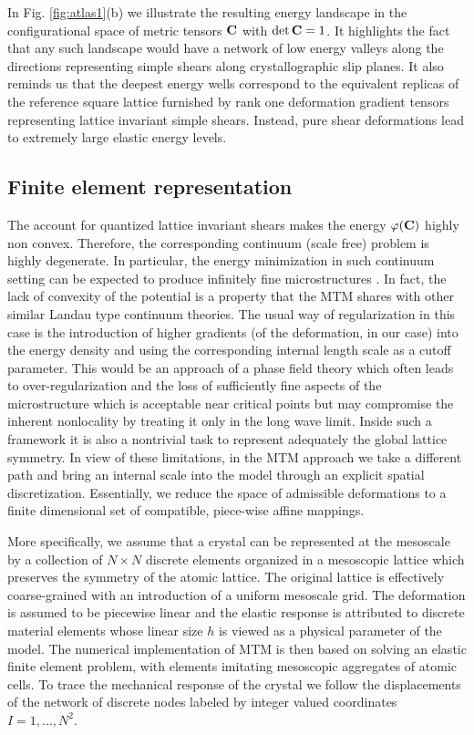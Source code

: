 \documentclass[aps,
superscriptaddress,notitlepage]{revtex4-1}
\def\phi{\varphi}
\begin{document}
In Fig. \ref{fig:atlas1}(b) we illustrate the resulting energy landscape  in the configurational space of metric tensors $\bf C$ with $\det{\bf C}=1$. It highlights the fact that any such  landscape would have  a network of low energy valleys along the directions representing simple shears along   crystallographic slip planes. It also reminds us that   the deepest energy wells  correspond  to the equivalent replicas of the reference square  lattice  furnished  by rank one deformation gradient tensors  representing lattice invariant simple shears. Instead, pure shear deformations  lead to extremely large elastic energy levels.

 

\subsection{Finite element representation}
\label{subsec:MTM_numerical_method}

The account for quantized lattice invariant shears makes the energy $\phi(\bf C)$ highly  non convex. Therefore,  the corresponding  continuum (scale free) problem is  highly degenerate.  In particular,  the energy minimization in such  continuum setting can be expected to produce infinitely fine microstructures \cite{Fonseca1987-pd}. In fact,  the lack of convexity of the potential is a property that the MTM   shares with other similar Landau type continuum theories. The usual way of regularization in this case  is  the introduction of  higher gradients (of the deformation, in our case) into the energy density and using the corresponding internal length scale as a cutoff parameter\cite{Hohenberg2015-jz}. This would be an approach of a phase field theory which often leads to over-regularization and the loss of sufficiently fine aspects of the microstructure which is acceptable near critical points but may compromise the inherent nonlocality by  treating it only in the long wave limit. Inside such a framework it is also a nontrivial task to represent  adequately the global lattice symmetry. In view of these limitations, in the MTM  approach we take a different path and bring  an internal  scale  into the model through  an explicit spatial discretization. Essentially, we  reduce  the space of admissible deformations to a finite dimensional set of compatible, piece-wise affine mappings.  

 More specifically, we   assume that   a crystal can be represented at the  mesoscale by a collection of $N \times N$   discrete elements organized in a  mesoscopic lattice  which preserves the symmetry of the atomic lattice. The   original lattice is effectively coarse-grained with an introduction of a uniform mesoscale grid.  The deformation is assumed to be piecewise linear and the   elastic  response is attributed   to   discrete material elements  whose linear size $h$ is viewed as a  physical parameter of the model. The numerical implementation of MTM is then based on solving an elastic finite element problem, with elements imitating mesoscopic aggregates  of atomic cells.  To trace the mechanical response of the crystal we follow the displacements of the   network of discrete nodes  labeled by integer valued coordinates $I =1,..., N^2$.
\end{document}
